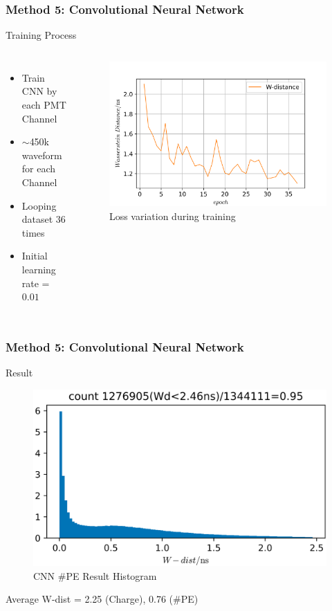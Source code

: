 \documentclass{beamer}
\begin{document}
\begin{frame}
\frametitle{Method 5: Convolutional Neural Network}
\Large Training Process \normalsize
\begin{columns}
\begin{itemize}
    \item Train CNN by each PMT Channel
    \item $\sim$450k waveform for each Channel
    \item Looping dataset 36 times
    \item Initial learning rate = $0.01$
\end{itemize}
\begin{figure}
    \centering
    \caption{Loss variation during training}
    \includegraphics[width=1.0\linewidth]{img/epoch.png}
\end{figure}
\end{columns}
\end{frame}

\begin{frame}
\frametitle{Method 5: Convolutional Neural Network}
\Large Result \normalsize
\begin{figure}
    \centering
    \caption{CNN \#PE Result Histogram}
    \includegraphics[width=0.85\linewidth]{img/takarapenumhist.png}
\end{figure}
\begin{center}
    Average W-dist = 2.25 (Charge), 0.76 (\#PE)
\end{center}
\end{frame}
\end{document}
